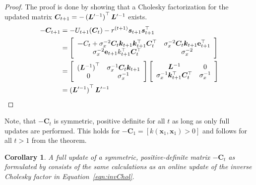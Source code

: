\documentclass[11pt,a4paper,twoside,BCOR=15mm]{scrbook}
\newtheorem{theorem}{Theorem}
\newtheorem{corollary}{Corollary}
\newcommand{\vc}[1]{\bm{#1}}
\newcommand{\mat}[1]{\bm{#1}}
\newcommand{\Tr}{^{\top}}
\newcommand{\e}{\mathrm{e}}
\begin{document}
\begin{proof} The proof is done by showing that a Cholesky factorization for the 
    updated matrix $\mat C_{t+1} = -\del[0]{\mat L'^{-1}}\Tr \mat L'^{-1}$ 
    exists.
\begin{align*}
        -\mat C_{t+1} &= -U_{t+1}(\mat C_t) - r^{(t+1)} \vc s_{t+1} \vc 
        s_{t+1}\Tr \\
        &= \sbr{\begin{array}{cc}
                \mat -C_t + \sigma_x^{-2} \mat C_t \vc k_{t+1} \vc k_{t+1}\Tr 
                \mat C_t\Tr & \sigma_x^{-2} \mat C_t \vc k_{t+1} \vc\e_{t+1}\Tr 
                \\
                \sigma_x^{-2} \vc\e_{t+1} k_{t+1}\Tr \mat C_t\Tr & \sigma_x^{-2}
            \end{array}} \\
        &= \sbr{\begin{array}{cc}
                \del[0]{\mat L^{-1}}\Tr & \sigma_x^{-1} \mat C_t \vc k_{t+1} \\
                0 & \sigma_x^{-1}
            \end{array}} \sbr{\begin{array}{cc}
                \mat L^{-1} & 0 \\
                \sigma_x^{-1} \vc k_{t+1}\Tr \mat C_t\Tr & \sigma_x^{-1}
            \end{array}} \\
        &= \del[0]{\mat L'^{-1}}\Tr \mat L'^{-1}
    \end{align*}
\end{proof}
Note, that $-\mat C_t$ is symmetric, positive definite for all $t$ as long as 
only full updates are performed. This holds for $-\mat C_1 = [k(\vc x_1, \vc 
x_1) > 0]$ and follows for all $t > 1$ from the theorem.

\begin{corollary}
    A full update of a symmetric, positive-definite matrix $-\mat{C}_t$ as 
    formulated by \textcite[equation~2.9]{Csato:2002fp} consists of the same 
    calculations as an online update of the inverse Cholesky factor in 
    Equation~\ref{eqn:invChol}.
\end{corollary}


\end{document}
